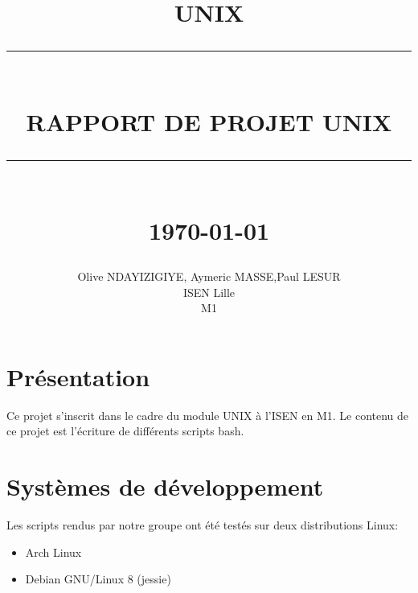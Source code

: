 \documentclass[12pt]{report}
\newcommand{\HRule}[1]{\rule{\linewidth}{#1}}
\begin{document}
\title{ \normalsize \textsc{UNIX}
        \\ [2.0cm]
        \HRule{0.5pt} \\
        \LARGE \textbf{\uppercase{Rapport de projet UNIX}}
        \HRule{2pt} \\ [0.5cm]
        \normalsize \today \vspace*{5\baselineskip}}

\date{}

\author{
        Olive NDAYIZIGIYE, Aymeric MASSE,Paul LESUR\\ 
        ISEN Lille\\
        M1}

\maketitle
\tableofcontents
\newpage

\sectionfont{\scshape}


\section*{Présentation}

Ce projet s'inscrit dans le cadre du module UNIX à l'ISEN en M1. Le contenu de ce projet est l'écriture de différents scripts bash.




\newpage
\section*{Systèmes de développement}

Les scripts rendus par notre groupe ont été testés sur deux distributions Linux:


\begin{itemize}
\item Arch Linux
\item Debian GNU/Linux 8 (jessie)
\end{itemize}
\end{document}
